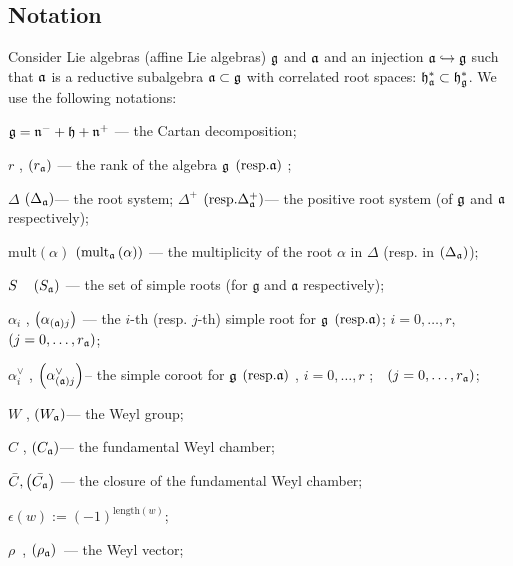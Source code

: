 \documentclass[12pt]{article}
\theoremstyle{definition}
\newcommand{\gf}{\mathfrak{g}}
\newcommand{\af}{\mathfrak{a}}
\begin{document}
\subsection{Notation}

\label{sec:notation}

Consider Lie algebras (affine Lie algebras) $\frak{g}$ and $\frak{a}$ and an
injection $\frak{a}\hookrightarrow \frak{g}$ such that $\frak{a}$ is a
reductive subalgebra $\frak{a\subset g}$ with correlated root spaces: $\frak{%
h}_{\frak{a}}^{\ast }\subset \frak{h}_{\frak{g}}^{\ast }$. We use the
following notations:

$\frak{g=n}^{-}+\frak{h}+\frak{n}^{+}$ --- the Cartan decomposition;

$r$ , $\left( r_{\frak{a}}\right) $ --- the rank of the algebra $\frak{g}$ $%
\left( \mathrm{{resp. }\frak{a}}\right) $ ;

$\Delta $ $\left( \Delta _{\frak{a}}\right) $--- the root system; $\Delta
^{+} $ $\left( \mathrm{{resp. }\Delta _{\frak{a}}^{+}}\right) $--- the
positive root system (of $\frak{g}$ and $\frak{a}$ respectively);

$\mathrm{mult}\left( \alpha \right) $ $\left( \mathrm{mult}_{\frak{a}}\left(
\alpha \right) \right) $ --- the multiplicity of the root $\alpha$ in $%
\Delta $ (resp. in $\left( \Delta _{\frak{a}}\right) $);

$S\quad \left( S_{\frak{a}}\right) $ --- the set of simple roots (for
$\gf$ and $\af$ respectively);

$\alpha _{i}$ , $\left( \alpha _{\left( \frak{a}\right) j}\right) $ --- the $%
i$-th (resp. $j$-th) simple root for $\frak{g}$ $\left( \mathrm{{resp.}\frak{a%
}}\right) $; $i=0,\ldots ,r$,\ \ $\left( j=0,\ldots ,r_{\frak{a}}\right) $;


$\alpha _{i}^{\vee }$ , $\left( \alpha _{\left( \frak{a}\right) j}^{\vee
}\right) $-- the simple coroot for $\frak{g}$ $\left( \mathrm{{resp.}\frak{a}%
}\right) $ , $i=0,\ldots ,r$ ;\ \ $\left( j=0,\ldots ,r_{\frak{a}}\right) $;

$W$ , $\left( W_{\frak{a}}\right) $--- the Weyl group;

$C$ , $\left( C_{\frak{a}}\right) $--- the fundamental Weyl chamber;

$\bar{C}, \left(\bar{C_{\frak{a}}}\right)$ --- the closure of the
fundamental Weyl chamber;

$\epsilon \left( w\right) :=\left( -1\right) ^{\mathrm{length}(w)}$;

$\rho $\ , $\left( \rho _{\frak{a}}\right) $\ --- the Weyl vector;
\end{document}
